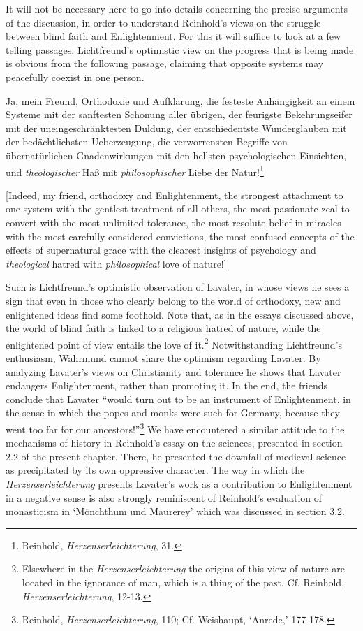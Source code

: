  It will not be necessary here to go into details concerning the precise arguments of the discussion, in order to understand Reinhold's views on the struggle between blind faith and Enlightenment. For this it will suffice to look at a few telling passages. Lichtfreund's optimistic view on the progress that is being made is obvious from the following passage, claiming that opposite systems may peacefully coexist in one person.

Ja, mein Freund, Orthodoxie und Aufkl\"{a}rung, die festeste Anh\"{a}ngigkeit an einem Systeme mit der sanftesten Schonung aller \"{u}brigen, der feurigste Bekehrungseifer mit der uneingeschr\"{a}nktesten Duldung, der entschiedentste Wunderglauben mit der bed\"{a}chtlichsten Ueberzeugung, die verworrensten Begriffe von \"{u}bernat\"{u}rlichen Gnadenwirkungen mit den hellsten psychologischen Einsichten, und \textit{theologischer} Ha\ss{} mit \textit{philosophischer} Liebe der Natur!\footnote{ Reinhold, \textit{Herzenserleichterung}, 31. }

[Indeed, my friend, orthodoxy and Enlightenment, the strongest attachment to one system with the gentlest treatment of all others, the most passionate zeal to convert with the most unlimited tolerance, the most resolute belief in miracles with the most carefully considered convictions, the most confused concepts of the effects of supernatural grace with the clearest insights of psychology and \textit{theological} hatred with \textit{philosophical} love of nature!]

Such is Lichtfreund's optimistic observation of Lavater, in whose views he sees a sign that even in those who clearly belong to the world of orthodoxy, new and enlightened ideas find some foothold. Note that, as in the essays discussed above, the world of blind faith is linked to a religious hatred of nature, while the enlightened point of view entails the love of it.\footnote{ Elsewhere in the \textit{Herzenserleichterung} the origins of this view of nature are located in the ignorance of man, which is a thing of the past. Cf. Reinhold, \textit{Herzenserleichterung}, 12{-}13. } Notwithstanding Lichtfreund's enthusiasm, Wahrmund cannot share the optimism regarding Lavater. By analyzing Lavater's views on Christianity and tolerance he shows that Lavater endangers Enlightenment, rather than promoting it. In the end, the friends conclude that Lavater ``would turn out to be an instrument of Enlightenment, in the sense in which the popes and monks were such for Germany, because they went too far for our ancestors!''\footnote{ Reinhold, \textit{Herzenserleichterung}, 110; Cf. Weishaupt, `Anrede,' 177{-}178. } We have encountered a similar attitude to the mechanisms of history in Reinhold's essay on the sciences, presented in section 2.2 of the present chapter. There, he presented the downfall of medieval science as precipitated by its own oppressive character. The way in which the \textit{Herzenserleichterung }presents Lavater's work as a contribution to Enlightenment in a negative sense is also strongly reminiscent of Reinhold's evaluation of monasticism in `M\"{o}nchthum und Maurerey' which was discussed in section 3.2. 

